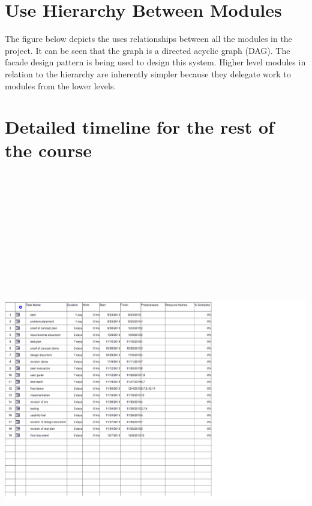 \documentclass[titlepage]{article}
\begin{document}
\section{Use Hierarchy Between Modules}
The figure below depicts the uses relationships between all the modules in the project. It can be seen that the graph is a directed acyclic graph (DAG). The facade design pattern is being used to design this system. Higher level modules in relation to the hierarchy are inherently simpler because they delegate work to  modules from the lower levels.\\


\section{Detailed timeline for the rest of the course}
\includegraphics[width=25cm, height=20cm]{detaildesign}\\
\end{document}
